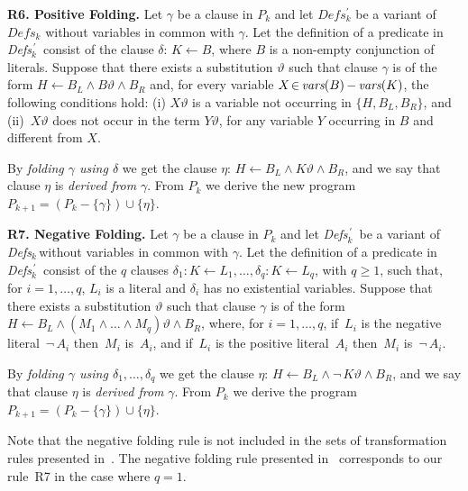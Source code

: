\documentclass[english]{tlp}
\newcommand{\vars}{${\it{vars}}$}
\renewcommand{\mathit}{\displaystyle}
\newcommand{\Mathit}[1]{\mbox{\it #1}}
\newcommand{\DefsPrk}{\Mathit{Defs}$_{k}^{\,\prime}$}
\newcommand{\Defsk}{\Mathit{Defs}$_{k}$}
\begin{document}
\smallskip{}

\noindent \textbf{R6. Positive Folding.} Let $\gamma$ be a clause in
$P_{k}$ and let $\mathit{Defs_k^{\prime}}$ be a variant of
$\mathit{Defs_k}$ without variables in common with $\gamma$. Let the
definition of a predicate in \DefsPrk~consist of the clause $\delta: \,
K\leftarrow B$, where $B$ is a non-empty conjunction of literals.
Suppose that there exists a substitution \( \vartheta  \) such that
clause $\gamma$ is of the form \( H\leftarrow B_{L}\wedge B\vartheta
\wedge B_{R} \) and, for every variable \( X \!\in
\,\vars(B)\,-\,\vars(K) \), the following conditions hold: (i) \(
X\vartheta \) is a variable not occurring in \( \{H,B_{L},B_{R}\}
\), and (ii)~\( X\vartheta  \) does not occur in the term \(
Y\vartheta  \), for any variable \( Y \) occurring in \( B \) and
different from \( X \).

\noindent By \emph{folding $\gamma$ using $\delta$} we get the
clause \(\eta  \): \( H\leftarrow B_{L}\wedge K\vartheta \wedge
B_{R} \), and we say that clause $\eta$  is {\it{derived from}}
$\gamma$. From \( P_{k} \) we derive the new program \(
P_{k+1}=(P_{k}-\{\gamma\})\cup \{\eta \} \).

\medskip{}

\noindent \textbf{R7. Negative Folding.} Let $\gamma$ be a clause in
\( P_{k} \) and let \DefsPrk~be a variant of \Defsk$\,$without
variables in common with $\gamma$. Let the definition of a predicate
in \DefsPrk~consist of the $q$ clauses \( \delta_{1}\!: K\leftarrow
L_{1},\ldots,\delta_{q}\!: K\leftarrow L_{q}\), with $q\!\geq\! 1$, such that, for
\(i=1,\ldots,q \), \( L_{i} \) is a literal and  \( \delta_{i} \)
has no existential variables. Suppose that there exists a
substitution \( \vartheta \) such that clause $\gamma$ is of the
form \( H\leftarrow B_{L}\wedge (M_1\wedge\ldots\wedge M_q)\vartheta
\wedge B_{R} \), where, for $i=1,\ldots,q$, if~$L_i$ is the negative
literal~$\neg\,A_i$ then~$M_i$ is~$A_i$, and if~$L_i$ is the
positive literal~$A_i$ then~$M_i$ is~$\neg\,A_i$.

\noindent By \emph{folding $\gamma$ using
\(\delta_{1},\ldots,\delta_{q}\)} we get the clause \(\eta\): \(
H\leftarrow B_{L}\wedge \neg\, K\vartheta \wedge B_{R} \), and we
say that clause $\eta$  is {\it{derived from}} $\gamma$. From \(
P_{k} \) we derive the program \( P_{k+1}=(P_{k}-\{\gamma\})\cup
\{\eta \}\).

\medskip

Note that the negative folding 
rule is not included in the sets of transformation rules
presented in~\cite{Ro&02,Sek91,Sek09}.
The negative folding rule presented in~\cite{Fi&04a,PeP00a} corresponds 
to our rule~R7 in the case where $q\!=\!1$. 
\end{document}
